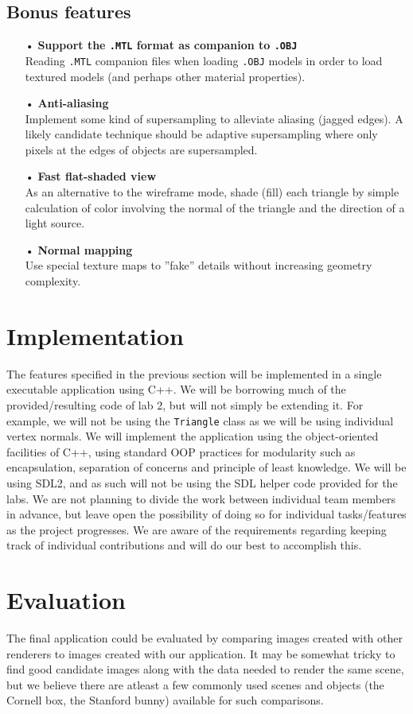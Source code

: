 \documentclass[a4paper,11pt]{article}
\begin{document}
\subsection*{Bonus features}
\begin{itemize}
\item[•] \textbf{Support the \texttt{.MTL} format as companion to \texttt{.OBJ}} \\
Reading \texttt{.MTL} companion files when loading \texttt{.OBJ} models in order to load
textured models (and perhaps other material properties).

\item[•] \textbf{Anti-aliasing} \\
Implement some kind of supersampling to alleviate aliasing (jagged edges). A likely candidate
technique should be adaptive supersampling where only pixels at the edges of objects are
supersampled.

\item[•] \textbf{Fast flat-shaded view}\\
As an alternative to the wireframe mode, shade (fill) each triangle by simple calculation of color
involving the normal of the triangle and the direction of a light source.

\item[•] \textbf{Normal mapping} \\
Use special texture maps to ''fake'' details without increasing geometry complexity.

\end{itemize}

\section*{Implementation}
The features specified in the previous section will be implemented in a single executable application
using C++. We will be borrowing much of the provided/resulting code of lab 2, but will not simply be
extending it. For example, we will not be using the \texttt{Triangle} class as we will be using
individual vertex normals. We will implement the application using the object-oriented facilities of
C++, using standard OOP practices for modularity such as encapsulation, separation of concerns and
principle of least knowledge. We will be using SDL2, and as such will not be using the SDL helper
code provided for the labs. We are not planning to divide the work between individual team members in advance, but
leave open the possibility of doing so for individual tasks/features as the project progresses. We
are aware of the requirements regarding keeping track of individual contributions and will do our
best to accomplish this.

\section*{Evaluation}
The final application could be evaluated by comparing images created with other renderers to images
created with our application. It may be somewhat tricky to find good candidate images along with
the data needed to render the same scene, but we believe there are atleast a few commonly used
scenes and objects (the Cornell box, the Stanford bunny) available for such comparisons.
\end{document}
